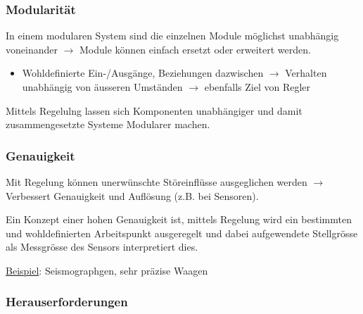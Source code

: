 \documentclass[
  10pt,
  a4paper,
  twocolumn]{article}
\providecommand{\tightlist}{%
  \setlength{\itemsep}{0pt}\setlength{\parskip}{0pt}}\usepackage{longtable,booktabs,array}
\numberwithin{equation}{section}
\begin{document}
\subsubsection{Modularität}\label{modularituxe4t}

In einem modularen System sind die einzelnen Module möglichst unabhängig
voneinander \(\rightarrow\) Module können einfach ersetzt oder erweitert
werden.

\begin{itemize}
\tightlist
\item
  Wohldefinierte Ein-/Ausgänge, Beziehungen dazwischen \(\rightarrow\)
  Verhalten unabhängig von äusseren Umständen \(\rightarrow\) ebenfalls
  Ziel von Regler
\end{itemize}

Mittels Regelulng lassen sich Komponenten unabhängiger und damit
zusammengesetzte Systeme Modularer machen.

\subsubsection{Genauigkeit}\label{genauigkeit}

Mit Regelung können unerwünschte Störeinflüsse ausgeglichen werden
\(\rightarrow\) Verbessert Genauigkeit und Auflösung (z.B. bei
Sensoren).

\begin{tcolorbox}[enhanced jigsaw, coltitle=black, colback=white, breakable, colframe=quarto-callout-note-color-frame, rightrule=.15mm, left=2mm, opacityback=0, leftrule=.75mm, toptitle=1mm, colbacktitle=quarto-callout-note-color!10!white, bottomtitle=1mm, arc=.35mm, bottomrule=.15mm, title=\textcolor{quarto-callout-note-color}{\faInfo}\hspace{0.5em}{Anwendungen}, titlerule=0mm, toprule=.15mm, opacitybacktitle=0.6]

Ein Konzept einer hohen Genauigkeit ist, mittels Regelung wird ein
bestimmten und wohldefinierten Arbeitspunkt ausgeregelt und dabei
aufgewendete Stellgrösse als Messgrösse des Sensors interpretiert dies.

\ul{Beispiel}: Seismographgen, sehr präzise Waagen

\end{tcolorbox}

\subsubsection{Herauserforderungen}\label{herauserforderungen}
\end{document}
